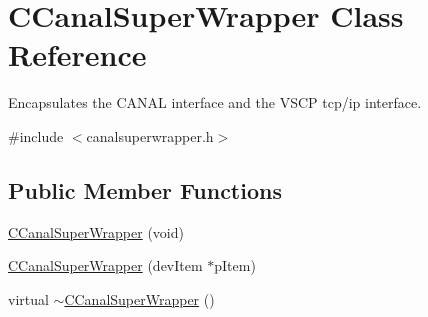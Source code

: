 \hypertarget{class_c_canal_super_wrapper}{
\section{CCanalSuperWrapper Class Reference}
\label{d5/d59/class_c_canal_super_wrapper}
}


Encapsulates the CANAL interface and the VSCP tcp/ip interface.  




{\ttfamily \#include $<$canalsuperwrapper.h$>$}

\subsection*{Public Member Functions}
\begin{DoxyCompactItemize}
\item 
\hyperlink{class_c_canal_super_wrapper_a7e4b1c85063ca59cbc854fe1b02860f4}{CCanalSuperWrapper} (void)
\item 
\hyperlink{class_c_canal_super_wrapper_a58243f0ceaab30291182028ce6e5db5f}{CCanalSuperWrapper} (devItem $\ast$pItem)
\item 
\hypertarget{class_c_canal_super_wrapper_ab230d6be3f203beb24d22b5dfbfe2c7a}{
virtual \hyperlink{class_c_canal_super_wrapper_ab230d6be3f203beb24d22b5dfbfe2c7a}{$\sim$CCanalSuperWrapper} ()}
\label{d5/d59/class_c_canal_super_wrapper_ab230d6be3f203beb24d22b5dfbfe2c7a}


\end{DoxyCompactItemize}
